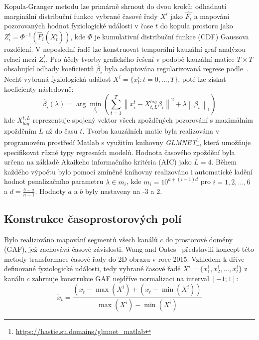 Kopula-Granger metodu lze primárně shrnout do dvou kroků: odhadnutí marginální
distribuční funkce vybrané časové řady $X^i$ jako $\hat{F_i}$ a mapování
pozorovaných hodnot fyziologické události v čase $t$ do kopula prostoru jako
$Z_{i}^t=\Phi^{-1}\left(\hat{F}_i\left(X_{t}^i\right)\right)$, kde $\Phi$ je
kumulativní distribuční funkce (\gls{CDF}) Gaussova rozdělení. V neposlední řadě
lze konstruovat temporální kauzální graf analýzou relací mezi $Z_{i}^t$. Pro
účely tvorby grafického řešení v podobě kauzální matice $T \times T$ obsahující
odhady koeficientů $\hat{\beta}_i$ byla adaptována regularizovaná regrese
podle~\cite{Bahdori2012}. Nechť vybraná fyziologická událost $X^i = \{x_t^i : t
= 0,...,T\}$, poté lze získat koeficienty následovně:
\begin{equation}
    \hat{\beta}_i(\lambda)=\arg \min _{\beta_i}\left(\sum_{t=1}^T\left\|x_i^t-X_{t, L}^{lag} \beta_i\right\|^2+\lambda\left\|\beta_i\right\|_1\right)
\end{equation}
kde $X_{lag}^{t, L}$ reprezentuje spojený vektor všech zpožděných pozorování s
maximálním zpožděním $L$ až do času $t$. Tvorba kauzálních matic byla
realizována v programovém prostředí Matlab s využitím knihovny
\textit{GLMNET}\footnote{\url{https://hastie.su.domains/glmnet_matlab}}, která
umožňuje specifikovat různé typy regresních modelů. Hodnota časového zpoždění
byla určena na základě Akaikeho informačního kritéria (\gls{AIC}) jako $L = 4$.
Během každého výpočtu bylo pomocí zmíněné knihovny realizováno i automatické
ladění hodnot penalizačního parametru $\lambda \in m_i$, kde $m_i = 10^{a +
(i-1)d}$ pro $i = {1, 2, ..., 6}$ a $d = \frac{b-a}{n-1}$. Hodnoty $a$ a $b$
byly nastaveny na -3 a 2.

\subsection{Konstrukce časoprostorových polí}
\label{subsec:gadf}
Bylo realizováno mapování segmentů všech kanálů $c$ do prostorové domény
(\gls{GAF}), jež zachovává časové závislosti. Wang and Oates~\cite{Wang2015}
představili koncept této metody transformace časové řady do 2D obrazu v roce
2015. Vzhledem k dříve definované fyziologické události, tedy vybrané časové
řadě $X^i = \{x_1^i, x_2^i, \dots, x_t^i\}$ z kanálu $c$ zahrnuje konstrukce
\gls{GAF} nejdříve normalizaci na interval $[-1; 1]$:
\begin{equation}
    \tilde{x}_t=\frac{\left(x_t-\max (X^i)+\left(x_t-\min (X^i)\right)\right.}{\max (X^i)-\min (X^i)}
\end{equation}

